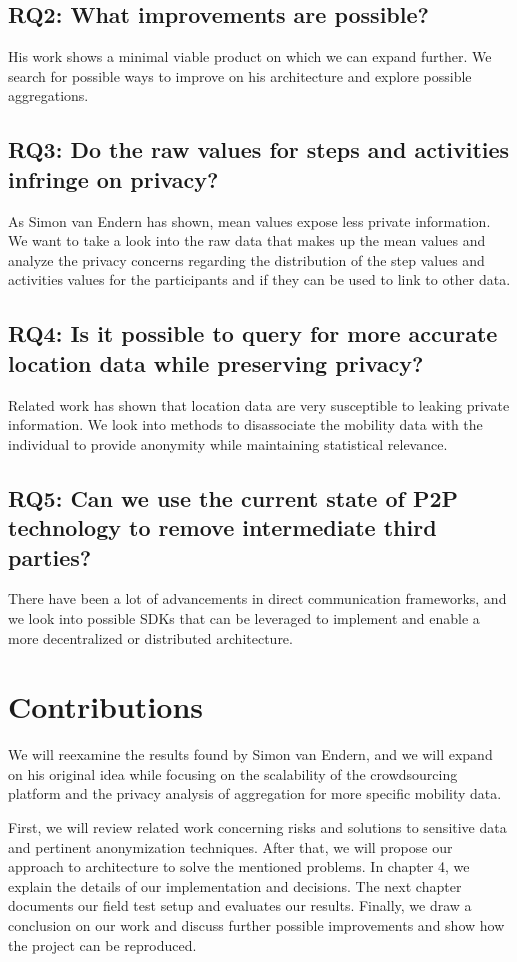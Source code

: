 \subsection*{RQ2: What improvements are possible?}
His work shows a minimal viable product on which we can expand further. We search for possible ways to improve on his architecture and explore possible aggregations.
\subsection*{RQ3: Do the raw values for steps and activities infringe on privacy?}
As Simon van Endern has shown, mean values expose less private information. We want to take a look into the raw data that makes up the mean values and analyze the privacy concerns regarding the distribution of the step values and activities values for the participants and if they can  be used to link to other data.
\subsection*{RQ4: Is it possible to query for more accurate location data while preserving privacy?}
Related work has shown that location data are very susceptible to leaking private information. We look into methods to disassociate the mobility data with the individual to provide anonymity while maintaining statistical relevance.
\subsection*{RQ5: Can we use the current state of P2P technology to remove intermediate third parties?}
There have been a lot of advancements in direct communication frameworks, and we look into possible SDKs that can be leveraged to implement and enable a more decentralized or distributed architecture.

\section{Contributions}

We will reexamine the results found by Simon van Endern, and we will expand on his original idea while focusing on the scalability of the crowdsourcing platform and the privacy analysis of aggregation for more specific mobility data.

First, we will review related work concerning risks and solutions to sensitive data and pertinent anonymization techniques. After that, we will propose our approach to architecture to solve the mentioned problems. In chapter 4, we explain the details of our implementation and decisions. The next chapter documents our field test setup and evaluates our results. Finally, we draw a conclusion on our work and discuss further possible improvements and show how the project can be reproduced.
